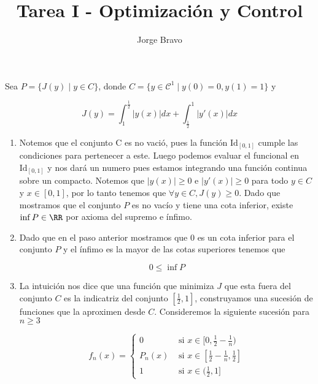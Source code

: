 \documentclass[a4paper,oneside,10.5pt]{USMArt}
\title{Tarea I - Optimización y Control}
\author{Jorge Bravo}
\begin{document}
\maketitle

\begin{sol}
  Sea $P = \{J(y) \; | \; y \in C\}$, donde $C = \{y \in \mathcal{C}^{1} \; | \; y(0) = 0, y(1) = 1\}$
  y

  \begin{equation*}
    J(y) = \int_{1}^{\frac12} |y(x)| dx + \int_{\frac12}^1 |y'(x)| dx
  \end{equation*}

  \begin{enumerate}
    \item Notemos que el conjunto C es no vació, pues la función $\text{Id}_{[0, 1]}$ cumple las condiciones para
      pertenecer a este. Luego podemos evaluar el funcional en $\text{Id}_{[0, 1]}$ y nos dará un numero pues estamos
      integrando una función continua sobre un compacto. Notemos que $|y(x)| \geq 0$ e $|y'(x)| \geq 0$
      para todo $y \in C$ y $x \in [0, 1]$, por lo tanto tenemos que $\forall y \in C, J(y) \geq 0$.
      Dado que mostramos que el conjunto $P$ es no vacío y tiene una cota inferior, existe $\inf P \in \RR$
      por axioma del supremo e ínfimo.

    \item Dado que en el paso anterior mostramos que $0$ es un cota inferior para el conjunto $P$ y el
     ínfimo es la mayor de las cotas superiores tenemos que

    \begin{equation*}
      0 \leq \inf P
    \end{equation*}

    \item La intuición nos dice que una función que minimiza $J$ que esta fuera del conjunto $C$
          es la indicatriz del conjunto $[\frac12, 1]$, construyamos una sucesión de funciones
          que la aproximen desde $C$. Consideremos la siguiente sucesión para $n \geq 3$

    \begin{equation*}
      f_{n}(x) = \begin{cases}
                   0 & \text{ si } x \in [0, \frac12 - \frac1n)\\
                   P_{n}(x) & \text{ si } x \in [\frac12 - \frac1n, \frac12]\\
                   1 & \text{ si } x \in (\frac12, 1]
                 \end{cases}
    \end{equation*}


\end{enumerate}
\end{sol}
\end{document}
